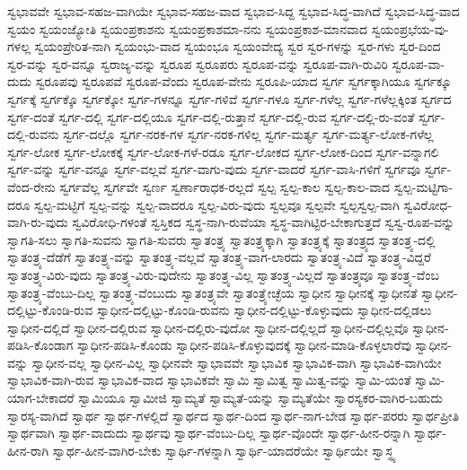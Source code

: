 {ಸ್ವಭಾವವೇ
ಸ್ವಭಾವ-ಸಹಜ-ವಾಗಿಯೇ
ಸ್ವಭಾವ-ಸಹಜ-ವಾದ
ಸ್ವಭಾವ-ಸಿದ್ದ
ಸ್ವಭಾವ-ಸಿದ್ಧ-ವಾಗಿದೆ
ಸ್ವಭಾವ-ಸಿದ್ಧ-ವಾದ
ಸ್ವಯಂ
ಸ್ವಯಂಜ್ಯೋತಿ
ಸ್ವಯಂಪ್ರಕಾಶನು
ಸ್ವಯಂಪ್ರಕಾಶಮಾ-ನನು
ಸ್ವಯಂಪ್ರಕಾಶ-ಮಾನವಾದ
ಸ್ವಯಂಪ್ರಭೆಯ-ವು-ಗಳಲ್ಲ
ಸ್ವಯಂಪ್ರೇರಿತ-ನಾಗಿ
ಸ್ವಯಂಭು-ವಾದ
ಸ್ವಯಂಭೂ
ಸ್ವಯಂವೇದ್ಯ
ಸ್ವರ
ಸ್ವರ-ಗಳನ್ನು
ಸ್ವರ-ಗಳು
ಸ್ವರ-ದಿಂದ
ಸ್ವರ-ವನ್ನು
ಸ್ವರ-ವನ್ನೂ
ಸ್ವರಾಜ್ಯ-ವನ್ನು
ಸ್ವರೂಪ
ಸ್ವರೂಪರು
ಸ್ವರೂಪ-ವನ್ನು
ಸ್ವರೂಪ-ವಾಗಿ-ರುವಿರಿ
ಸ್ವರೂಪ-ವಾ-ದುದು
ಸ್ವರೂಪವು
ಸ್ವರೂಪವೆ
ಸ್ವರೂಪ-ವೆಂದು
ಸ್ವರೂಪ-ವೇನು
ಸ್ವರೂಪಿ-ಯಾದ
ಸ್ವರ್ಗ
ಸ್ವರ್ಗಕ್ಕಾಗಿಯೂ
ಸ್ವರ್ಗಕ್ಕೂ
ಸ್ವರ್ಗಕ್ಕೆ
ಸ್ವರ್ಗಕ್ಕೊ
ಸ್ವರ್ಗಕ್ಕೋ
ಸ್ವರ್ಗ-ಗಳನ್ನೂ
ಸ್ವರ್ಗ-ಗಳಿವೆ
ಸ್ವರ್ಗ-ಗಳೂ
ಸ್ವರ್ಗ-ಗಳೆಲ್ಲ
ಸ್ವರ್ಗ-ಗಳೆಲ್ಲಕ್ಕಿಂತ
ಸ್ವರ್ಗದ
ಸ್ವರ್ಗ-ದಂತೆ
ಸ್ವರ್ಗ-ದಲ್ಲಿ
ಸ್ವರ್ಗ-ದಲ್ಲಿಯೂ
ಸ್ವರ್ಗ-ದಲ್ಲಿ-ರುತ್ತಾನೆ
ಸ್ವರ್ಗ-ದಲ್ಲಿ-ರುವ
ಸ್ವರ್ಗ-ದಲ್ಲಿ-ರು-ವಂತೆ
ಸ್ವರ್ಗ-ದಲ್ಲಿ-ರುವನು
ಸ್ವರ್ಗ-ದಲ್ಲೊ
ಸ್ವರ್ಗ-ನರಕ-ಗಳ
ಸ್ವರ್ಗ-ನರಕ-ಗಳಿಲ್ಲ
ಸ್ವರ್ಗ-ಮರ್ತ್ಯ
ಸ್ವರ್ಗ-ಮರ್ತ್ಯ-ಲೋಕ-ಗಳೆಲ್ಲ
ಸ್ವರ್ಗ-ಲೋಕ
ಸ್ವರ್ಗ-ಲೋಕಕ್ಕೆ
ಸ್ವರ್ಗ-ಲೋಕ-ಗಳೆ-ರಡೂ
ಸ್ವರ್ಗ-ಲೋಕದ
ಸ್ವರ್ಗ-ಲೋಕ-ದಿಂದ
ಸ್ವರ್ಗ-ವನ್ನಾಗಲಿ
ಸ್ವರ್ಗ-ವನ್ನು
ಸ್ವರ್ಗ-ವನ್ನೂ
ಸ್ವರ್ಗ-ವಲ್ಲವೆ
ಸ್ವರ್ಗ-ವಾಗು-ವುದು
ಸ್ವರ್ಗ-ವಾದರೆ
ಸ್ವರ್ಗ-ವಾಸಿ-ಗಳಿಗೆ
ಸ್ವರ್ಗವೂ
ಸ್ವರ್ಗ-ವೆಂದ-ರೇನು
ಸ್ವರ್ಗವೆಲ್ಲ
ಸ್ವರ್ಗವೇ
ಸ್ವರ್ಣ
ಸ್ವರ್ಣಾರಾಧಕ-ರಲ್ಲದೆ
ಸ್ವಲ್ಪ
ಸ್ವಲ್ಪ-ಕಾಲ
ಸ್ವಲ್ಪ-ಕಾಲ-ವಾದ
ಸ್ವಲ್ಪ-ಮಟ್ಟಿಗಾ-ದರೂ
ಸ್ವಲ್ಪ-ಮಟ್ಟಿಗೆ
ಸ್ವಲ್ಪ-ವನ್ನು
ಸ್ವಲ್ಪ-ವಾದರೂ
ಸ್ವಲ್ಪ-ವಿರು-ವುದು
ಸ್ವಲ್ಪವೂ
ಸ್ವಲ್ಪವೇ
ಸ್ವಲ್ಪಸ್ವಲ್ಪ-ವಾಗಿ
ಸ್ವವಿರೋಧ-ವಾಗಿ-ರು-ವುದು
ಸ್ವವಿರೋಧಿ-ಗಳಂತೆ
ಸ್ವಸ್ತಿಕದ
ಸ್ವಸ್ಥ-ನಾಗಿ-ರುವೆಯಾ
ಸ್ವಸ್ಥ-ವಾಗಿಟ್ಟಿರ-ಬೇಕಾಗುತ್ತದೆ
ಸ್ವಸ್ವ-ರೂಪ-ವನ್ನು
ಸ್ವಾಗತಿ-ಸಲು
ಸ್ವಾಗತಿ-ಸುವನು
ಸ್ವಾಗತಿ-ಸುವರು
ಸ್ವಾತಂತ್ರ್ಯ
ಸ್ವಾತಂತ್ರ್ಯಕ್ಕಾಗಿ
ಸ್ವಾತಂತ್ರ್ಯಕ್ಕೆ
ಸ್ವಾತಂತ್ರ್ಯದ
ಸ್ವಾತಂತ್ರ್ಯ-ದಲ್ಲಿ
ಸ್ವಾತಂತ್ರ್ಯ-ದೆಡೆಗೆ
ಸ್ವಾತಂತ್ರ್ಯ-ವನ್ನು
ಸ್ವಾತಂತ್ರ್ಯ-ವಲ್ಲವೆ
ಸ್ವಾತಂತ್ರ್ಯ-ವಾಗ-ಲಾರದು
ಸ್ವಾತಂತ್ರ್ಯ-ವಿದೆ
ಸ್ವಾತಂತ್ರ್ಯ-ವಿದ್ದರೆ
ಸ್ವಾತಂತ್ರ್ಯ-ವಿರು-ವುದು
ಸ್ವಾತಂತ್ರ್ಯ-ವಿರು-ವುದೇನು
ಸ್ವಾತಂತ್ರ್ಯ-ವಿಲ್ಲ
ಸ್ವಾತಂತ್ರ್ಯ-ವಿಲ್ಲದೆ
ಸ್ವಾತಂತ್ರ್ಯವೂ
ಸ್ವಾತಂತ್ರ್ಯ-ವೆಂಬ
ಸ್ವಾತಂತ್ರ್ಯ-ವೆಂಬು-ದಿಲ್ಲ
ಸ್ವಾತಂತ್ರ್ಯ-ವೆಂಬುದು
ಸ್ವಾತಂತ್ರ್ಯವೇ
ಸ್ವಾತಂತ್ರ್ಯೇಚ್ಛೆಯ
ಸ್ವಾಧೀನ
ಸ್ವಾಧೀನಕ್ಕೆ
ಸ್ವಾಧೀನತೆ
ಸ್ವಾಧೀನ-ದಲ್ಲಿಟ್ಟು-ಕೊಂಡಿ-ರುವ
ಸ್ವಾಧೀನ-ದಲ್ಲಿಟ್ಟು-ಕೊಂಡಿ-ರುವನು
ಸ್ವಾಧೀನ-ದಲ್ಲಿಟ್ಟು-ಕೊಳ್ಳುವುದು
ಸ್ವಾಧೀನ-ದಲ್ಲಿಡಲು
ಸ್ವಾಧೀನ-ದಲ್ಲಿದೆ
ಸ್ವಾಧೀನ-ದಲ್ಲಿರುವ
ಸ್ವಾಧೀನ-ದಲ್ಲಿರು-ವುದೋ
ಸ್ವಾಧೀನ-ದಲ್ಲಿಲ್ಲದೆ
ಸ್ವಾಧೀನ-ದಲ್ಲಿಲ್ಲವೊ
ಸ್ವಾಧೀನ-ಪಡಿಸಿ-ಕೊಂಡಾಗ
ಸ್ವಾಧೀನ-ಪಡಿಸಿ-ಕೊಂಡು
ಸ್ವಾಧೀನ-ಪಡಿಸಿ-ಕೊಳ್ಳುವುದಕ್ಕೆ
ಸ್ವಾಧೀನ-ಮಾಡಿ-ಕೊಳ್ಳಲಾರೆವು
ಸ್ವಾಧೀನ-ವನ್ನು
ಸ್ವಾಧೀನ-ವಲ್ಲ
ಸ್ವಾಧೀನ-ವಿಲ್ಲ
ಸ್ವಾಧೀನವೇ
ಸ್ವಾಭಾವವೇ
ಸ್ವಾಭಾವಿಕ
ಸ್ವಾಭಾವಿಕ-ವಾಗಿ
ಸ್ವಾಭಾವಿಕ-ವಾಗಿಯೇ
ಸ್ವಾಭಾವಿಕ-ವಾಗಿ-ರುವ
ಸ್ವಾಭಾವಿಕ-ವಾದ
ಸ್ವಾಭಾವಿಕವೇ
ಸ್ವಾಮಿ
ಸ್ವಾಮಿತ್ವ
ಸ್ವಾಮಿತ್ವ-ವನ್ನು
ಸ್ವಾಮಿ-ಯಂತೆ
ಸ್ವಾಮಿ-ಯಾಗ-ಬೇಕಾದರೆ
ಸ್ವಾಮಿಯೂ
ಸ್ವಾಮೀಜಿ
ಸ್ವಾಮ್ಯತೆ
ಸ್ವಾಮ್ಯತೆ-ಯನ್ನು
ಸ್ವಾಮ್ಯತೆಯೇ
ಸ್ವಾರಸ್ಯಕರ-ವಾಗಿರ-ಬಹುದು
ಸ್ವಾರಸ್ಯ-ವಾಗಿದೆ
ಸ್ವಾರ್ಥ
ಸ್ವಾರ್ಥ-ಗಳಲ್ಲಿದೆ
ಸ್ವಾರ್ಥದ
ಸ್ವಾರ್ಥ-ದಿಂದ
ಸ್ವಾರ್ಥ-ನಾಗ-ಬೇಡ
ಸ್ವಾರ್ಥ-ಪರರು
ಸ್ವಾರ್ಥಪ್ರೀತಿ
ಸ್ವಾರ್ಥವಾಗಿ
ಸ್ವಾರ್ಥ-ವಾದುದು
ಸ್ವಾರ್ಥವು
ಸ್ವಾರ್ಥ-ವೆಂಬು-ದಿಲ್ಲ
ಸ್ವಾರ್ಥ-ವೊಂದೇ
ಸ್ವಾರ್ಥ-ಹೀನ-ರನ್ನಾಗಿ
ಸ್ವಾರ್ಥ-ಹೀನ-ರಾಗಿ
ಸ್ವಾರ್ಥ-ಹೀನ-ವಾಗಿರ-ಬೇಕು
ಸ್ವಾರ್ಥಿ-ಗಳನ್ನಾಗಿ
ಸ್ವಾರ್ಥಿ-ಯಾದರೆಯೇ
ಸ್ವಾರ್ಥಿಯೇ
ಸ್ವಾಸ್ಥ್ಯ
}
